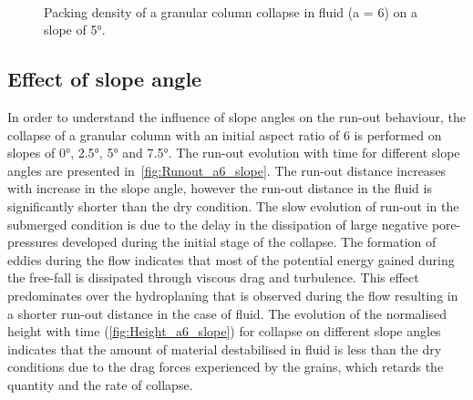 \documentclass[epj,twocolumn]{webofc}
\begin{document}
\begin{figure}
\\
\caption{Packing density of a granular column collapse in fluid (a = 6) on a 
slope of 5\si{\degree}.}
\label{fig:a6_slope_voro}
\end{figure}

\subsection{Effect of slope angle}
In order to understand the influence of slope angles on the run-out behaviour, 
the collapse of a granular column with an initial aspect ratio of 6 is 
performed on slopes of 0\si{\degree}, 2.5\si{\degree}, 5\si{\degree} and 
7.5\si{\degree}. The run-out evolution with time for different slope angles are 
presented in~\cref{fig:Runout_a6_slope}. The run-out distance increases with 
increase in the slope angle, however the run-out distance in the fluid is 
significantly shorter than the dry condition. The slow evolution of run-out in 
the submerged condition is due to the delay in the dissipation of large 
negative pore-pressures developed during the initial stage of the collapse. The 
formation of eddies during the flow indicates that most of the potential energy 
gained during the free-fall is dissipated through viscous drag and turbulence. 
This effect predominates over the hydroplaning that is observed during 
the flow resulting in a shorter run-out distance in the case of fluid. The 
evolution of the normalised height with time (\cref{fig:Height_a6_slope}) for 
collapse on different slope angles indicates that the 
amount of material destabilised in fluid is less than the dry conditions due to 
the drag forces experienced by the grains, which retards the quantity and the 
rate of collapse.
\end{document}
